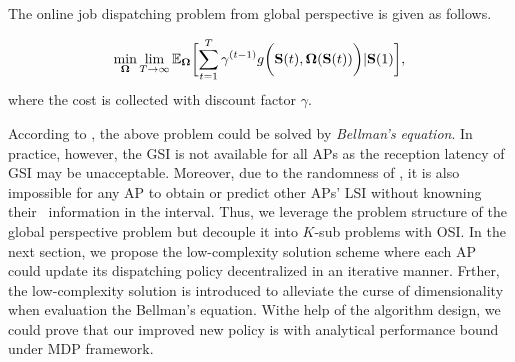 The online job dispatching problem from global perspective is given as follows.
\begin{problem}
    \begin{align}
        \min_{\Policy} \lim_{T \to \infty}
            \mathbb{E}_{\Policy}
                \Bracket{ \sum_{t=1}^T \gamma^{(t-1)} g\Paren{\Stat(t), \Policy(\Stat(t))} | \Stat(1) },
    \end{align}
    where the cost is collected with discount factor $\gamma$.
    \label{problem_1}
\end{problem}


According to \cite{sutton1998introduction}, the above problem could be solved by \emph{Bellman's equation}.
In practice, however, the GSI is not available for all APs as the reception latency of GSI may be unacceptable.
Moreover, due to the randomness of \brlatency, it is also impossible for any AP to obtain or predict other APs' LSI without knowning their \brlatency~information in the interval.
Thus, we leverage the problem structure of the global perspective problem but decouple it into $K$-sub problems
with OSI.
In the next section, we propose the low-complexity solution scheme where each AP could update its dispatching policy decentralized in an iterative manner.
Frther, the low-complexity solution is introduced to alleviate the curse of dimensionality when evaluation the Bellman's equation.
Withe help of the algorithm design, we could prove that our improved new policy is with analytical performance bound under MDP framework.

